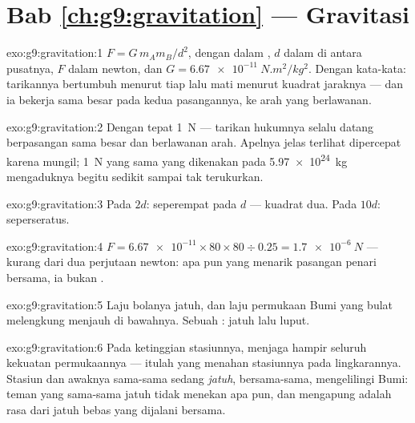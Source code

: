 \section*{Bab \ref{ch:g9:gravitation} --- Gravitasi}

\begin{solution}{exo:g9:gravitation:1}
$F = G \, m_A m_B / d^2$, dengan  dalam , $d$ dalam
 di antara pusatnya, $F$ dalam newton, dan
$G = \qty{6.67e-11}{N.m^2/kg^2}$. Dengan kata-kata: tarikannya
bertumbuh menurut tiap  lalu mati menurut kuadrat jaraknya ---
dan ia bekerja sama besar pada kedua pasangannya, ke arah yang
berlawanan.
\end{solution}

\begin{solution}{exo:g9:gravitation:2}
Dengan tepat \qty{1}{N} --- tarikan hukumnya selalu datang berpasangan
sama besar dan berlawanan arah. Apelnya jelas terlihat dipercepat
karena  mungil; \qty{1}{N} yang sama yang dikenakan pada
\qty{5.97e24}{kg}  mengaduknya begitu sedikit sampai tak
terukurkan.
\end{solution}

\begin{solution}{exo:g9:gravitation:3}
Pada $2d$: seperempat  pada $d$ --- kuadrat dua. Pada $10d$:
seperseratus.
\end{solution}

\begin{solution}{exo:g9:gravitation:4}
$F = \num{6.67e-11} \times 80 \times 80 \div 0.25 =
\qty{1.7e-6}{N}$ --- kurang dari dua perjutaan newton: apa pun yang
menarik pasangan penari bersama, ia bukan .
\end{solution}

\begin{solution}{exo:g9:gravitation:5}
Laju bolanya jatuh, dan laju permukaan Bumi yang bulat melengkung
menjauh di bawahnya. Sebuah : jatuh lalu luput.
\end{solution}

\begin{solution}{exo:g9:gravitation:6}
Pada ketinggian stasiunnya,  menjaga hampir seluruh kekuatan
permukaannya --- itulah yang menahan stasiunnya pada lingkarannya.
Stasiun dan awaknya sama-sama sedang \emph{jatuh}, bersama-sama,
mengelilingi Bumi: teman yang sama-sama jatuh tidak menekan apa pun,
dan mengapung adalah rasa dari jatuh bebas yang dijalani bersama.
\end{solution}

